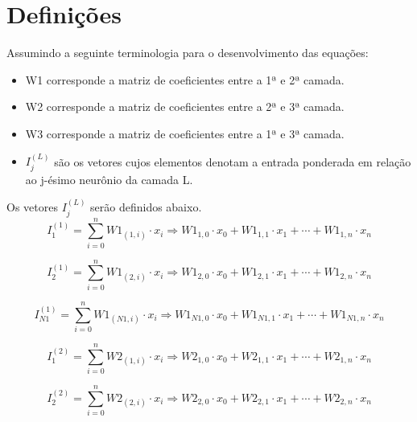 \documentclass{article}
\begin{document}
\section{Definições}
\par Assumindo a seguinte terminologia para o desenvolvimento das equações:
\begin{itemize}
  \item W1 corresponde a matriz de coeficientes entre a 1ª e 2ª camada.
  \item W2 corresponde a matriz de coeficientes entre a 2ª e 3ª camada.
  \item W3 corresponde a matriz de coeficientes entre a 1ª e 3ª camada.
  \item $I^{(L)}_{j}$ são os vetores cujos elementos denotam a entrada ponderada em relação ao j-ésimo neurônio da camada L.
\end{itemize}


\par Os vetores $I^{(L)}_{j}$ serão definidos abaixo.
\begin{equation}
  I^{(1)}_{1} = \sum_{i=0}^{n} W1_{(1,i)} \cdot x_{i} \Longrightarrow
  W1_{1,0} \cdot x_{0} + W1_{1,1} \cdot x_{1} + \cdots + W1_{1,n} \cdot x_{n}
  \label{eq:somatorio_i11}
\end{equation}


\begin{equation}
  I^{(1)}_{2} = \sum_{i=0}^{n} W1_{(2,i)} \cdot x_{i} \Longrightarrow
  W1_{2,0} \cdot x_{0} + W1_{2,1} \cdot x_{1} + \cdots + W1_{2,n} \cdot x_{n}
  \label{eq:somatorio_i12}
\end{equation}


\begin{equation}
  I^{(1)}_{N1} = \sum_{i=0}^{n} W1_{(N1,i)} \cdot x_{i} \Longrightarrow
  W1_{N1,0} \cdot x_{0} + W1_{N1,1} \cdot x_{1} + \cdots + W1_{N1,n} \cdot x_{n}
  \label{eq:somatorio_i1n1}
\end{equation}


\begin{equation}
  I^{(2)}_{1} = \sum_{i=0}^{n} W2_{(1,i)} \cdot x_{i} \Longrightarrow
  W2_{1,0} \cdot x_{0} + W2_{1,1} \cdot x_{1} + \cdots + W2_{1,n} \cdot x_{n}
  \label{eq:somatorio_i21}
\end{equation}

\begin{equation}
  I^{(2)}_{2} = \sum_{i=0}^{n} W2_{(2,i)} \cdot x_{i} \Longrightarrow
  W2_{2,0} \cdot x_{0} + W2_{2,1} \cdot x_{1} + \cdots + W2_{2,n} \cdot x_{n}
  \label{eq:somatorio_i22}
\end{equation}
\end{document}
